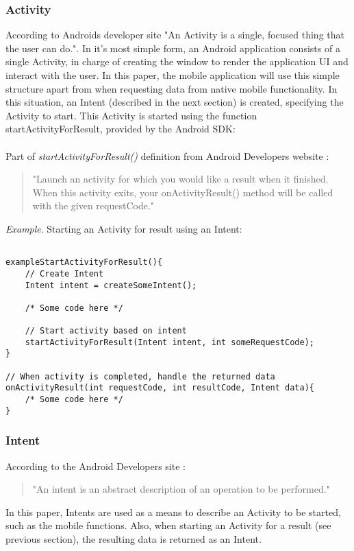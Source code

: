 \subsubsection{Activity}\label{subsubsec:activity}
According to Androids developer site \cite{activity2015} "An Activity is a single, focused thing that the user can do.". In it's most simple form, an Android application consists of a single Activity, in charge of creating the window to render the application UI and interact with the user. In this paper, the mobile application will use this simple structure apart from when requesting data from native mobile functionality. In this situation, an Intent (described in the next section) is created, specifying the Activity to start. This Activity is started using the function startActivityForResult, provided by the Android SDK:
\\\\
Part of \emph{startActivityForResult()} definition from Android Developers website \cite{androiddevelopers2015}:\\
\begin{quotation}
"Launch an activity for which you would like a result when it finished. When this activity exits, your onActivityResult() method will be called with the given requestCode."
\end{quotation}

\emph{Example}. Starting an Activity for result using an Intent:
\begin{lstlisting}

exampleStartActivityForResult(){
	// Create Intent
	Intent intent = createSomeIntent();
	
	/* Some code here */
	
	// Start activity based on intent
	startActivityForResult(Intent intent, int someRequestCode);
}

// When activity is completed, handle the returned data
onActivityResult(int requestCode, int resultCode, Intent data){
	/* Some code here */
}
\end{lstlisting}

\subsubsection{Intent}\label{subsubsec:intent}
According to the Android Developers site \cite{intent2015}:
\begin{quotation}
"An intent is an abstract description of an operation to be performed."
\end{quotation}
In this paper, Intents are used as a means to describe an Activity to be started, such as the mobile functions. Also, when starting an Activity for a result (see previous section), the resulting data is returned as an Intent. 

